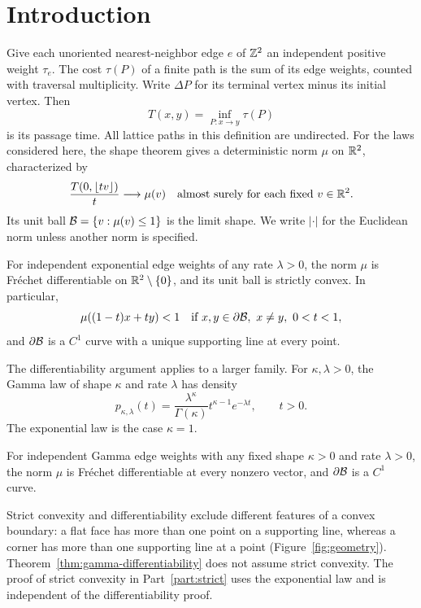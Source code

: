 \section{Introduction}
\label{sec:introduction}

Give each unoriented nearest-neighbor edge $e$ of $\mathbb Z^2$ an independent
positive weight $\tau_e$. The cost $\tau(P)$ of a finite path is the sum
of its edge weights, counted with traversal multiplicity. Write
$\Delta P$ for its terminal vertex minus its initial vertex. Then
\[
 T(x,y)=\inf_{P:x\to y}\tau(P)
\]
is its passage time. All lattice paths in this definition are undirected.
For the laws considered here, the shape theorem gives a deterministic
norm $\mu$ on $\mathbb R^2$, characterized by
\[
 \frac{T(0,\lfloor tv\rfloor)}t\longrightarrow\mu(v)
 \quad\text{almost surely for each fixed }v\in\mathbb R^2.
\]
Its unit ball $\mathcal B=\{v:\mu(v)\le1\}$ is the limit shape.
We write $|\cdot|$ for the Euclidean norm unless another norm is specified.

\begin{theorem}
\label{thm:exponential-shape}
For independent exponential edge weights of any rate $\lambda>0$,
the norm $\mu$ is Fr\'echet differentiable on $\mathbb R^2\setminus\{0\}$,
and its unit ball is strictly convex. In particular,
\[
 \mu((1-t)x+ty)<1
 \quad\text{if }x,y\in\partial\mathcal B,\ x\ne y,\ 0<t<1,
\]
and $\partial\mathcal B$ is a $C^1$ curve with a unique supporting line
at every point.
\end{theorem}

The differentiability argument applies to a larger family. For
$\kappa,\lambda>0$, the Gamma law of shape $\kappa$ and rate $\lambda$
has density
\[
 p_{\kappa,\lambda}(t)
 =\frac{\lambda^\kappa}{\Gamma(\kappa)}
   t^{\kappa-1}e^{-\lambda t},\qquad t>0.
\]
The exponential law is the case $\kappa=1$.

\begin{theorem}
\label{thm:gamma-differentiability}
For independent Gamma edge weights with any fixed shape $\kappa>0$
and rate $\lambda>0$, the norm $\mu$ is Fr\'echet differentiable at
every nonzero vector, and $\partial\mathcal B$ is a $C^1$ curve.
\end{theorem}

Strict convexity and differentiability exclude different features of a
convex boundary: a flat face has more than one point on a supporting
line, whereas a corner has more than one supporting line at a point
(Figure~\ref{fig:geometry}). Theorem~\ref{thm:gamma-differentiability}
does not assume strict convexity. The proof of strict convexity in
Part~\ref{part:strict} uses the exponential law and is independent of
the differentiability proof.

